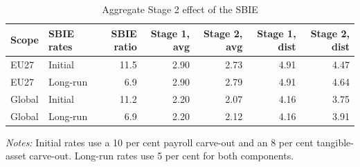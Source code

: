 \begin{table}[H]
\centering
\small
\setlength{\tabcolsep}{4pt}
\caption[Aggregate Stage 2 effect of the SBIE]{Aggregate Stage 2 effect of the SBIE}
\label{tab:stage2_aggregate_updated}
\begin{tabular}{@{}llrrrrr@{}}
\toprule
Scope & SBIE rates & SBIE ratio & Stage 1, avg & Stage 2, avg & Stage 1, dist & Stage 2, dist \\
\midrule
EU27 & Initial & 11.5 & 2.90 & 2.73 & 4.91 & 4.47 \\
EU27 & Long-run &  6.9 & 2.90 & 2.79 & 4.91 & 4.64 \\
Global & Initial & 11.2 & 2.20 & 2.07 & 4.16 & 3.75 \\
Global & Long-run &  6.9 & 2.20 & 2.12 & 4.16 & 3.91 \\
\bottomrule
\end{tabular}

\vspace{0.35em}
\noindent\begin{minipage}{\textwidth}
\footnotesize\raggedright\textit{Notes:} Initial rates use a 10 per cent payroll carve-out and an 8 per cent tangible-asset carve-out. Long-run rates use 5 per cent for both components.
\end{minipage}
\end{table}
